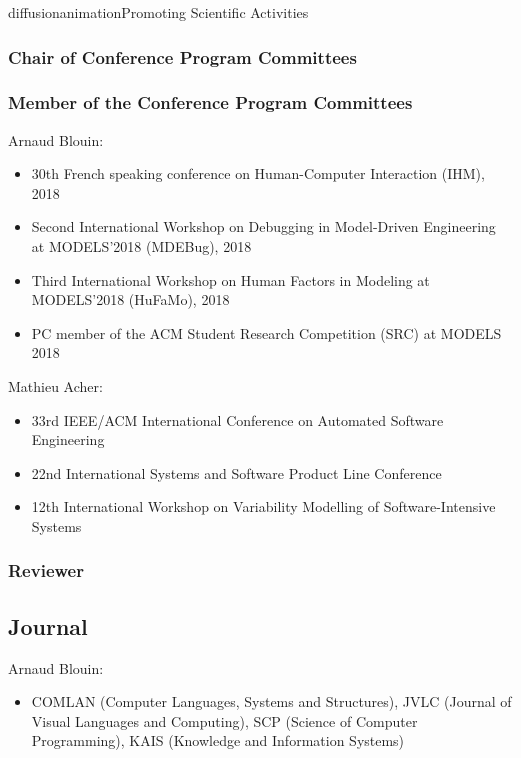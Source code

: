 \documentclass{ra2018}
\begin{document}
\begin{module}{diffusion}{animation}{Promoting Scientific Activities}
    \subsubsection{Chair of Conference Program Committees}
    
    \subsubsection{Member of the Conference Program Committees}
    
Arnaud Blouin:
\begin{itemize}
    \item 30th French speaking conference on Human-Computer Interaction (IHM), 2018
    \item Second International Workshop on Debugging in Model-Driven Engineering at MODELS'2018 (MDEBug), 2018
    \item Third International Workshop on Human Factors in Modeling at MODELS'2018 (HuFaMo), 2018
	\item PC member of the ACM Student Research Competition (SRC) at MODELS 2018
\end{itemize} 


Mathieu Acher:
\begin{itemize}
    \item 33rd IEEE/ACM International Conference on Automated Software Engineering 
    \item 22nd International Systems and Software Product Line Conference 
    \item 12th International Workshop on Variability Modelling of Software-Intensive Systems
\end{itemize} 
    
    \subsubsection{Reviewer}
    
    \subsection{Journal}

Arnaud Blouin:
\begin{itemize}
    \item COMLAN (Computer Languages, Systems and Structures), JVLC (Journal of Visual Languages and Computing), SCP (Science of Computer Programming), KAIS (Knowledge and Information Systems)
\end{itemize} 


\end{module}
\end{document}
